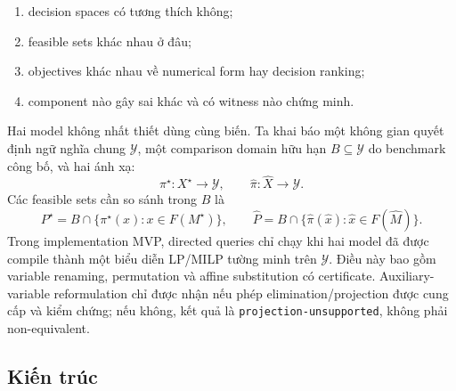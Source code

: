 \documentclass[11pt,a4paper]{article}
\begin{document}
\begin{enumerate}
  \item decision spaces có tương thích không;
  \item feasible sets khác nhau ở đâu;
  \item objectives khác nhau về numerical form hay decision ranking;
  \item component nào gây sai khác và có witness nào chứng minh.
\end{enumerate}

Hai model không nhất thiết dùng cùng biến. Ta khai báo một không gian quyết
định ngữ nghĩa chung \(\mathcal Y\), một comparison domain hữu hạn
\(B\subseteq\mathcal Y\) do benchmark công bố, và hai ánh xạ:
\[
\pi^\star:X^\star\rightarrow\mathcal Y,\qquad
\widehat\pi:\widehat X\rightarrow\mathcal Y.
\]
Các feasible sets cần so sánh trong \(B\) là
\[
P^\star=B\cap\{\pi^\star(x):x\in F(M^\star)\},\qquad
\widehat P=B\cap\{\widehat\pi(\hat x):\hat x\in F(\widehat M)\}.
\]
Trong implementation MVP, directed queries chỉ chạy khi hai model đã được
compile thành một biểu diễn LP/MILP tường minh trên \(\mathcal Y\). Điều này
bao gồm variable renaming, permutation và affine substitution có certificate.
Auxiliary-variable reformulation chỉ được nhận nếu phép elimination/projection
được cung cấp và kiểm chứng; nếu không, kết quả là
\texttt{projection-unsupported}, không phải non-equivalent.

\subsection{Kiến trúc}
\end{document}
